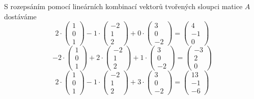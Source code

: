\reseni
S rozepsáním pomocí lineárních kombinací vektorů tvořených sloupci matice $A$ dostáváme
\begin{equation*}2\cdot
  \begin{pmatrix}
  1 \\
  0 \\
  1 
\end{pmatrix}
-1\cdot
\begin{pmatrix}
   -2 \\
   1 \\
   2 
\end{pmatrix}
+0\cdot
\begin{pmatrix}
3\\
 0\\
 -2
\end{pmatrix}
=
\begin{pmatrix}
4\\
 -1\\
 0
\end{pmatrix}
\end{equation*}
\begin{equation*}-2\cdot
  \begin{pmatrix}
  1 \\
  0 \\
  1 
\end{pmatrix}
+2\cdot
\begin{pmatrix}
   -2 \\
   1 \\
   2 
\end{pmatrix}
+1\cdot
\begin{pmatrix}
3\\
 0\\
 -2
\end{pmatrix}
=
\begin{pmatrix}
-3\\
 2\\
 0
\end{pmatrix}
\end{equation*}
\begin{equation*}2\cdot
  \begin{pmatrix}
  1 \\
  0 \\
  1 
\end{pmatrix}
-1\cdot
\begin{pmatrix}
   -2 \\
   1 \\
   2 
\end{pmatrix}
+3\cdot
\begin{pmatrix}
3\\
 0\\
 -2
\end{pmatrix}
=
\begin{pmatrix}
13\\
 -1\\
 -6
\end{pmatrix}
\end{equation*}
